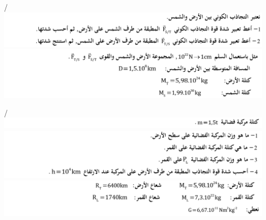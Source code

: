 \documentclass[12pt,a4paper]{article}
\begin{document}
\begin{exercice}{}/
					\includegraphics[width=\linewidth]{images/Tc/p1/e13_1.png}
					\includegraphics[width=\linewidth]{images/Tc/p1/e13_2.png}
					\end{exercice}%
\begin{exercice}{}/
					\includegraphics[width=\linewidth]{images/Tc/p1/e16_1.png}
					\includegraphics[width=\linewidth]{images/Tc/p1/e16_2.png}
					\includegraphics[width=\linewidth]{images/Tc/p1/e16_3.png}
					\end{exercice}%
  
\end{document}

